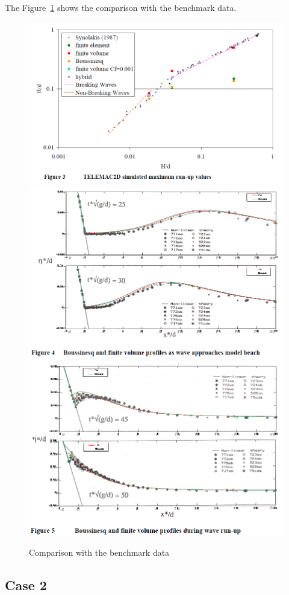 The Figure~\ref{fig:tests:res} shows the comparison with the benchmark data.
\begin{figure}
\centering
\includegraphics[width=.8\textwidth]{img/fig3.png}
\includegraphics[width=.8\textwidth]{img/fig4.png}
\includegraphics[width=.8\textwidth]{img/fig5.png}
\caption{Comparison with the benchmark data}\label{fig:tests:res}
\end{figure}

\subsection{Case 2}

